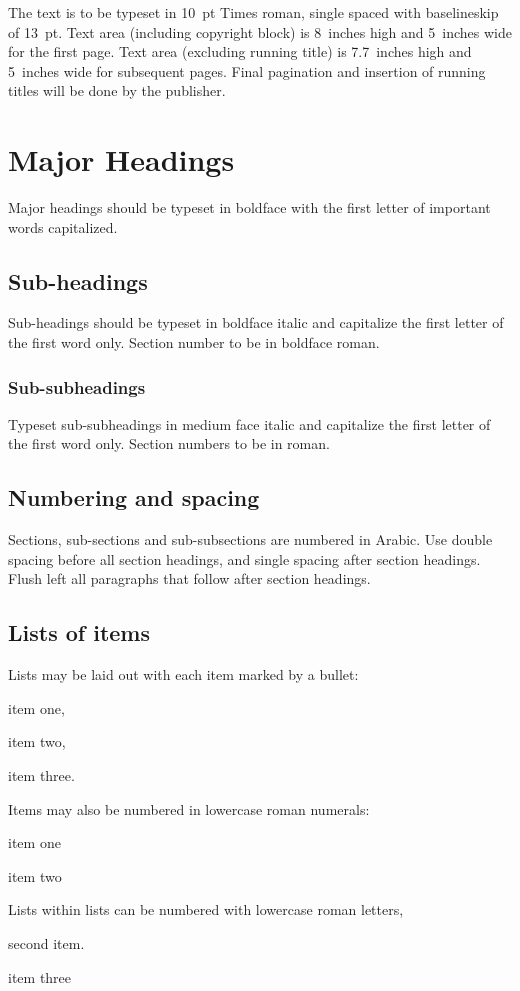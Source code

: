 \documentclass{ws-jbcb}
\begin{document}
The text is to be typeset in 10~pt Times roman, single spaced with
baselineskip of 13~pt. Text area (including copyright block) is 8~inches high and 5~inches wide for the first page.  Text area (excluding running title) is 7.7~inches high and 5~inches wide for subsequent pages. Final pagination and insertion of running titles will be done by the publisher.

\section{Major Headings}
Major headings should be typeset in boldface with the first letter of
important words capitalized.

\subsection{Sub-headings}
Sub-headings should be typeset in boldface italic and capitalize
the first letter of the first word only. Section number to be in
boldface roman.

\subsubsection{Sub-subheadings}
Typeset sub-subheadings in medium face italic and capitalize the
first letter of the first word only. Section numbers to be in
roman.

\subsection{Numbering and spacing}
Sections, sub-sections and sub-subsections are numbered in
Arabic. Use double spacing before all section headings, and
single spacing after section headings. Flush left all paragraphs
that follow after section headings.

\subsection{Lists of items}
Lists may be laid out with each item marked by a bullet:
\begin{itemlist}
 \item item one,
 \item item two,
 \item item three.
\end{itemlist}
Items may also be numbered in lowercase roman numerals:
\begin{romanlist}[(iii)]
 \item item one
 \item item two
	\begin{alphlist}[(b)]
	\item Lists within lists can be numbered with lowercase
              roman letters,
	\item second item.
	\end{alphlist}
\item item three
\end{romanlist}
\end{document}
